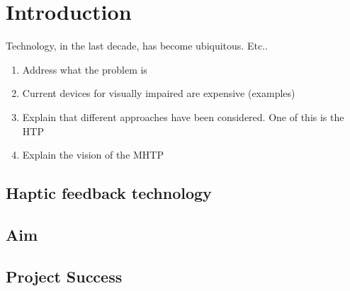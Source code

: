 \chapter*{Introduction}

Technology, in the last decade, has become ubiquitous. Etc..

\begin{enumerate}
    	\item Address what the problem is
        \item Current devices for visually impaired are expensive (examples)
        \item Explain that different approaches have been considered. One of this is the HTP
        \item Explain the vision of the MHTP
  	\end{enumerate}
    
\section*{Haptic feedback technology}

    
\section*{Aim}

\section*{Project Success}
